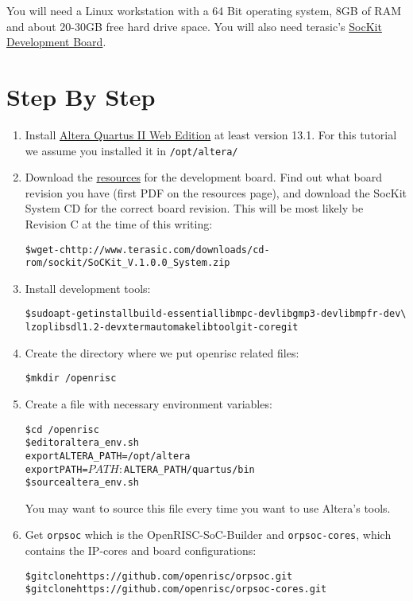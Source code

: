 \documentclass[twoside]{article}
\begin{document}
You will need a Linux workstation with a 64 Bit operating system, 8GB
of RAM and about 20-30GB free hard drive space. You will also need
terasic's
\href{http://www.terasic.com.tw/cgi-bin/page/archive.pl?Language=English\&No=816}{SocKit
  Development Board}.


\section{Step By Step}
\begin{enumerate}
\item Install \href{http://dl.altera.com/?edition=web}{Altera Quartus
    II Web Edition} at least version 13.1. For this tutorial we assume
  you installed it in \texttt{/opt/altera/}

\item Download the
  \href{http://www.terasic.com.tw/cgi-bin/page/archive.pl?Language=English\&CategoryNo=165\&No=816\&PartNo=4}{resources}
  for the development board. Find out what board revision you have
  (first PDF on the resources page), and download the SocKit System CD
  for the correct board revision. This will be most likely be Revision
  C at the time of this writing:
  \begin{alltt}
\$ wget -c http://www.terasic.com/downloads/cd-rom/sockit/SoCKit\_V.1.0.0\_System.zip
  \end{alltt}

\item Install development tools:
  \begin{alltt}
\$ sudo apt-get install build-essential libmpc-dev libgmp3-dev libmpfr-dev  \textbackslash
                       lzop libsdl1.2-dev xterm automake libtool git-core git
  \end{alltt}

\item Create the directory where we put openrisc related files:
  \begin{alltt}
\$ mkdir ~/openrisc
  \end{alltt}

\item Create a file with necessary environment variables:
  \begin{alltt}
\$ cd ~/openrisc
\$ editor altera_env.sh
\hrulefill
export ALTERA_PATH=/opt/altera
export PATH=$PATH:$ALTERA_PATH/quartus/bin
\hrulefill
\$ source altera_env.sh
  \end{alltt}
  You may want to source this file every time you want to use Altera's
  tools.

\item Get \texttt{orpsoc} which is the OpenRISC-SoC-Builder and
  \texttt{orpsoc-cores}, which contains the IP-cores and board
  configurations:
  \begin{alltt}
\$ git clone https://github.com/openrisc/orpsoc.git
\$ git clone https://github.com/openrisc/orpsoc-cores.git
  \end{alltt}

\end{enumerate}
\end{document}
